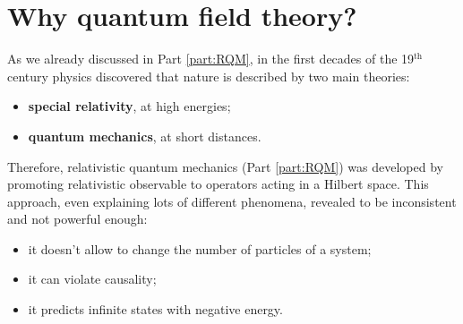 \section{Why quantum field theory?}
As we already discussed in Part \ref{part:RQM}, in the first decades of the 19$^{\text{th}}$ century physics discovered that nature is described by two main theories:
\begin{itemize}
    \item \textbf{special relativity}, at high energies;
    \item \textbf{quantum mechanics}, at short distances. 
\end{itemize}
Therefore, relativistic quantum mechanics (Part \ref{part:RQM}) was developed by promoting relativistic observable to operators acting in a Hilbert space. This approach, even explaining lots of different phenomena, revealed to be inconsistent and not powerful enough:
\begin{itemize}
    \item it doesn't allow to change the number of particles of a system;
    \item it can violate causality;
    \item it predicts infinite states with negative energy.
\end{itemize}
\vspace{0.5cm}

